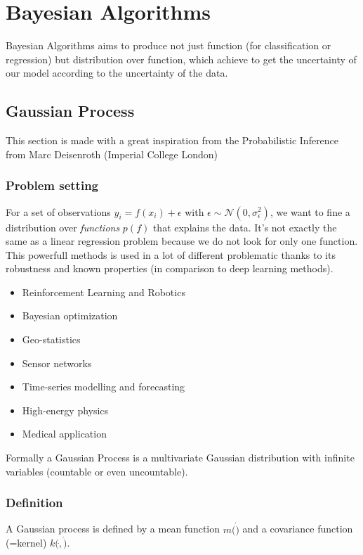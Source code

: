 \chapter{Bayesian Algorithms} %
\label{cha:bayesian_algorithms}

	Bayesian Algorithms aims to produce not just function (for classification or regression) but distribution over function, which achieve to get the uncertainty of our model according to the uncertainty of the data.

	\section{Gaussian Process}

		This section is made with a great inspiration from the Probabilistic Inference from Marc Deisenroth (Imperial College London)
		\subsection{Problem setting} %
		\label{sub:problem_setting}
			For a set of observations $y_i = f(x_i) + \epsilon$ with $\epsilon \sim \mathcal{N}(0, \sigma_\epsilon^2)$, we want to fine a distribution over \emph{functions} $p(f)$ that explains the data. It's not exactly the same as a linear regression problem because we do not look for only one function.\\
			This powerfull methods is used in a lot of different problematic thanks to its robustness and known properties (in comparison to deep learning methods).
			\begin{itemize}
				\item Reinforcement Learning and Robotics
				\item Bayesian optimization
				\item Geo-statistics 
				\item Sensor networks
				\item Time-series modelling and forecasting
				\item High-energy physics
				\item Medical application
			\end{itemize}
			Formally a Gaussian Process is a multivariate Gaussian distribution with infinite variables (countable or even uncountable).

		\subsection{Definition} %
		\label{sub:definition}
			A Gaussian process is defined by a mean function $m(\dot)$ and a covariance function (=kernel) $k(\dot, \dot)$.

